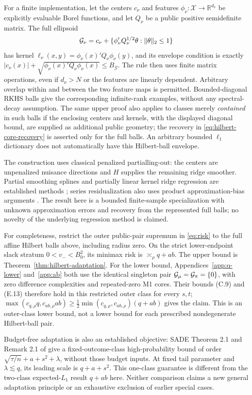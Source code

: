 For a finite implementation, let the centers $c_\nu$ and features
$\phi_\nu:\mathcal X\to\mathbb R^{d_\nu}$ be explicitly evaluable Borel
functions, and let $Q_\nu$ be a public positive semidefinite matrix.  The full ellipsoid
\[
 \mathcal G_\nu=c_\nu+
 \{\phi_\nu'Q_\nu^{1/2}\theta:\|\theta\|_2\le1\}
\]
has kernel $\ell_\nu(x,y)=\phi_\nu(x)'Q_\nu\phi_\nu(y)$, and its
envelope condition is exactly
$|c_\nu(x)|+\sqrt{\phi_\nu(x)'Q_\nu\phi_\nu(x)}\le B_{\mathcal G}$.
The rule then uses finite matrix operations, even if $d_\nu>N$ or the
features are linearly dependent.  Arbitrary overlap within and between
the two feature maps is permitted.  Bounded-diagonal RKHS balls give the
corresponding infinite-rank examples, without any spectral-decay
assumption.  The same upper proof also applies to classes merely
\emph{contained} in such balls if the enclosing centers and kernels,
with the displayed diagonal bound, are supplied as additional public
geometry; the recovery in \eqref{eq:hilbert-core-recovery} is asserted
only for the full balls.  An arbitrary bounded $\ell_1$ dictionary does
not automatically have this Hilbert-ball envelope.

The construction uses classical penalized partialling-out: the centers
are unpenalized nuisance directions and $H$ supplies the remaining ridge
smoother.  Partial smoothing splines and partially linear kernel ridge
regression are established methods
\citep{heckman1986spline,zhao2016partially}; series residualization also
uses product approximation-bias arguments
\citep{cattaneo2018alternative}.  The result here is a bounded
finite-sample specialization with unknown approximation errors and
recovery from the represented full balls; no novelty of the underlying
regression method is claimed.

For completeness, restrict the outer public-pair supremum in
\eqref{eq:risk} to the full affine Hilbert balls above, including radius
zero.  On the strict lower-endpoint slack stratum $0<v_-<B_0^2$, its
minimax risk is $\asymp_\rho q+ab$.  The upper bound is
Theorem~\ref{thm:hilbert-adaptation}.  For the lower bound,
Appendices~\ref{app:q-lower} and~\ref{app:ab} both use the identical
singleton pair $\mathcal G_\mu=\mathcal G_\pi=\{0\}$, with zero difference
complexities and repeated-zero M1 cores.  Their bounds (C.9) and (E.13)
therefore hold in this restricted outer class for every $s,t$;
$\max(c_{q,\rho}q,c_{ab,\rho}ab)\ge
\tfrac12\min(c_{q,\rho},c_{ab,\rho})(q+ab)$ gives the claim.
This is an outer-class lower bound, not a lower bound for each prescribed
nondegenerate Hilbert-ball pair.

Budget-free adaptation is also an established objective: SADE
Theorem 2.1 and Remark 2.1 of \citet{gu2026tamingbiases} give a
fixed-outcome-class high-probability bound of order
\(\sqrt{\tau/n}+a+s^2+\lambda\), without those budget inputs.
At fixed tail parameter and \(\lambda\lesssim q\), its leading scale
is \(q+a+s^2\). This one-class guarantee is different from the
two-class expected-\(L_1\) result \(q+ab\) here. Neither comparison claims a new general
adaptation principle or an exhaustive exclusion of earlier special cases.

